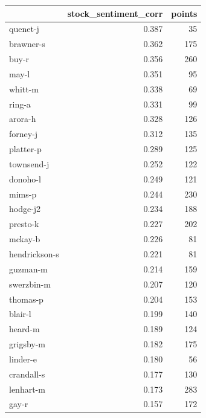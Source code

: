 \documentclass{vldb}
\begin{document}
\begin{appendix}
\begin{supertabular}{ l r r }
\toprule
{} &  stock\_sentiment\_corr &  points \\
\midrule
quenet-j       &                 0.387 &      35 \\
brawner-s      &                 0.362 &     175 \\
buy-r          &                 0.356 &     260 \\
may-l          &                 0.351 &      95 \\
whitt-m        &                 0.338 &      69 \\
ring-a         &                 0.331 &      99 \\
arora-h        &                 0.328 &     126 \\
forney-j       &                 0.312 &     135 \\
platter-p      &                 0.289 &     125 \\
townsend-j     &                 0.252 &     122 \\
donoho-l       &                 0.249 &     121 \\
mims-p         &                 0.244 &     230 \\
hodge-j2       &                 0.234 &     188 \\
presto-k       &                 0.227 &     202 \\
mckay-b        &                 0.226 &      81 \\
hendrickson-s  &                 0.221 &      81 \\
guzman-m       &                 0.214 &     159 \\
swerzbin-m     &                 0.207 &     120 \\
thomas-p       &                 0.204 &     153 \\
blair-l        &                 0.199 &     140 \\
heard-m        &                 0.189 &     124 \\
grigsby-m      &                 0.182 &     175 \\
linder-e       &                 0.180 &      56 \\
crandall-s     &                 0.177 &     130 \\
lenhart-m      &                 0.173 &     283 \\
gay-r          &                 0.157 &     172 \\

\end{supertabular}
\end{appendix}
\end{document}
